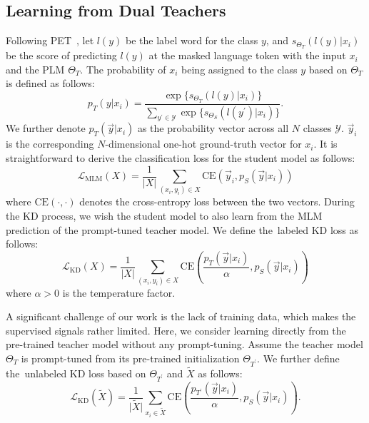 \documentclass{article}
\begin{document}
\subsection{Learning from Dual Teachers}

Following PET~\cite{DBLP:conf/eacl/SchickS21}, let $l(y)$ be the label word for the class $y$, and $s_{\Theta_T}(l(y)\vert x_i)$ be the score of predicting $l(y)$ at the masked language token with the input $x_i$ and the PLM $\Theta_T$.
The probability of $x_i$ being assigned to the class $y$ based on $\Theta_T$ is defined as follows:
\begin{equation}
	p_{T}(y\vert x_i)=\frac{\exp\{s_{\Theta_T}(l(y)\vert x_i)\}}{\sum_{y^{'}\in\mathcal{Y}}\exp\{s_{\Theta_S}(l(y^{'})\vert x_i)\}}.
\end{equation}
We further denote $p_{T}(\vec{y}\vert x_i)$ as the probability vector across all $N$ classes $\mathcal{Y}$. $\vec{y}_i$ is the corresponding $N$-dimensional one-hot ground-truth vector for $x_i$.
It is straightforward to derive the classification loss for the student model as follows:
\begin{equation}
	\mathcal{L}_{\text{MLM}}(X)=\frac{1}{\vert X\vert}\sum_{(x_i,y_i)\in X}\text{CE}(\vec{y}_i,   p_{S}(\vec{y}\vert x_i))
\end{equation}
where $\text{CE}(\cdot,\cdot)$ denotes the cross-entropy loss between the two vectors.
During the KD process, we wish the student model to also learn from the MLM prediction of the prompt-tuned teacher model.
We define the~{labeled KD loss} as follows:
\begin{equation}
	\mathcal{L}_{\text{KD}}(X)=\frac{1}{\vert X\vert}\sum_{(x_i,y_i)\in X}\text{CE}\left(\frac{p_T(\vec{y}\vert x_i)}{\alpha}, p_S(\vec{y}\vert x_i)\right)
\end{equation}
where $\alpha>0$ is the temperature factor.

A significant challenge of our work is the lack of training data, which makes the supervised signals rather limited. Here, we consider learning directly from the pre-trained teacher model without any prompt-tuning. Assume the teacher model ${\Theta}_{T}$ is prompt-tuned from its pre-trained initialization ${\Theta}_{T^{'}}$.
We further define the~{unlabeled KD loss} based on ${\Theta}_{T^{'}}$ and $\tilde{X}$ as follows:
\begin{equation}
	\mathcal{L}_{\text{KD}}(\tilde{X})=\frac{1}{\vert\tilde{X}\vert}\sum_{x_i\in \tilde{X}}\text{CE}\left(\frac{p_{T^{'}}(\vec{y}\vert x_i)}{\alpha}, p_S(\vec{y}\vert x_i)\right).
\end{equation}
\end{document}
